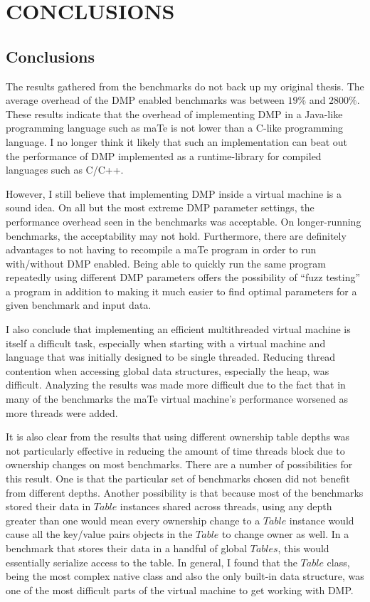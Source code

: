 \chapter{CONCLUSIONS}
\label{CONCLUSIONS}

\section{Conclusions}

The results gathered from the benchmarks do not back up my original
thesis.  The average overhead of the DMP enabled benchmarks was
between $19\%$ and $2800\%$.  These results indicate that the overhead
of implementing DMP in a Java-like programming language such as maTe
is not lower than a C-like programming language.  I no longer think it
likely that such an implementation can beat out the performance of DMP
implemented as a runtime-library for compiled languages such as C/C++.

However, I still believe that implementing DMP inside a virtual
machine is a sound idea.  On all but the most extreme DMP parameter
settings, the performance overhead seen in the benchmarks was
acceptable.  On longer-running benchmarks, the acceptability may not
hold.  Furthermore, there are definitely advantages to not having to
recompile a maTe program in order to run with/without DMP enabled.
Being able to quickly run the same program repeatedly using different
DMP parameters offers the possibility of ``fuzz testing'' a program in
addition to making it much easier to find optimal parameters for a
given benchmark and input data.

I also conclude that implementing an efficient multithreaded virtual
machine is itself a difficult task, especially when starting with a
virtual machine and language that was initially designed to be single
threaded.  Reducing thread contention when accessing global data
structures, especially the heap, was difficult.  Analyzing the results
was made more difficult due to the fact that in many of the benchmarks
the maTe virtual machine's performance worsened as more threads were
added.

It is also clear from the results that using different ownership table
depths was not particularly effective in reducing the amount of time
threads block due to ownership changes on most benchmarks.  There are
a number of possibilities for this result.  One is that the particular
set of benchmarks chosen did not benefit from different depths.
Another possibility is that because most of the benchmarks stored
their data in $Table$ instances shared across threads, using any depth
greater than one would mean every ownership change to a $Table$
instance would cause all the key/value pairs objects in the $Table$ to
change owner as well.  In a benchmark that stores their data in a
handful of global $Tables$, this would essentially serialize access to
the table.  In general, I found that the $Table$ class, being the most
complex native class and also the only built-in data structure, was
one of the most difficult parts of the virtual machine to get working
with DMP.

